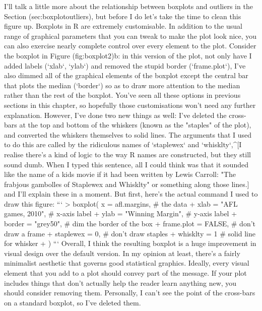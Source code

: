 I'll talk a little more about the relationship between boxplots and outliers in the Section \@ref(sec:boxplotoutliers), but before I do let's take the time to clean this figure up. Boxplots in R are extremely customisable. In addition to the usual range of graphical parameters that you can tweak to make the plot look nice, you can also exercise nearly complete control over every element to the plot. Consider the boxplot in Figure \@ref(fig:boxplot2)b: in this version of the plot, not only have I added labels (`xlab`, `ylab`) and removed the stupid border (`frame.plot`), I've also dimmed all of the graphical elements of the boxplot except the central bar that plots the median (`border`) so as to draw more attention to the median rather than the rest of the boxplot. You've seen all these options in previous sections in this chapter, so hopefully those customisations won't need any further explanation. However, I've done two new things as well: I've deleted the cross-bars at the top and bottom of the whiskers (known as the "staples" of the plot), and converted the whiskers themselves to solid lines. The arguments that I used to do this are called by the ridiculous names of `staplewex` and `whisklty`,^[I realise there's a kind of logic to the way R names are constructed, but they still sound dumb. When I typed this sentence, all I could think was that it sounded like the name of a kids movie if it had been written by Lewis Carroll: "The frabjous gambolles of Staplewex and Whisklty" or something along those lines.] and I'll explain these in a moment. But first, here's the actual command I used to draw this figure:
```
> boxplot( x = afl.margins,           # the data
+          xlab = "AFL games, 2010",  # x-axis label
+          ylab = "Winning Margin",   # y-axis label
+          border = "grey50",         # dim the border of the box
+          frame.plot = FALSE,        # don't draw a frame
+          staplewex = 0,             # don't draw staples
+          whisklty = 1               # solid line for whisker 
+ )
```
Overall, I think the resulting boxplot is a huge improvement in visual design over the default version. In my opinion at least, there's a fairly minimalist aesthetic that governs good statistical graphics. Ideally, every visual element that you add to a plot should convey part of the message. If your plot includes things that don't actually help the reader learn anything new, you should consider removing them. Personally, I can't see the point of the cross-bars on a standard boxplot, so I've deleted them.

